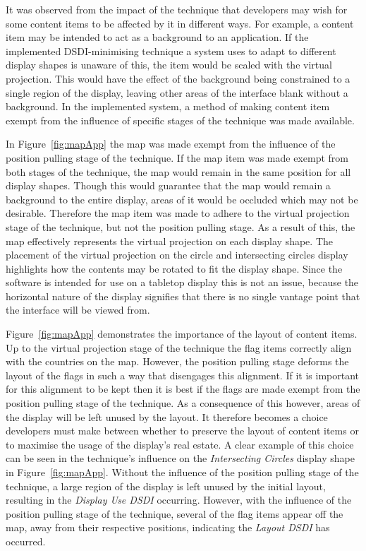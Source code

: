 \documentclass{bmcart}
\begin{document}
It was observed from the impact of the technique that developers may wish for some content items to be affected by it in different ways.
For example, a content item may be intended to act as a background to an application.
If the implemented \ac{DSDI}-minimising technique a system uses to adapt to different display shapes is unaware of this, the item would be scaled with the virtual projection.
This would have the effect of the background being constrained to a single region of the display, leaving other areas of the interface blank without a background.
In the implemented system, a method of making content item exempt from the influence of specific stages of the technique was made available.


In Figure~\ref{fig:mapApp} the map was made exempt from the influence of the position pulling stage of the technique.
If the map item was made exempt from both stages of the technique, the map would remain in the same position for all display shapes.
Though this would guarantee that the map would remain a background to the entire display, areas of it would be occluded which may not be desirable.
Therefore the map item was made to adhere to the virtual projection stage of the technique, but not the position pulling stage.
As a result of this, the map effectively represents the virtual projection on each display shape.
The placement of the virtual projection on the circle and intersecting circles display highlights how the contents may be rotated to fit the display shape.
Since the software is intended for use on a tabletop display this is not an issue, because the horizontal nature of the display signifies that there is no single vantage point that the interface will be viewed from.


Figure~\ref{fig:mapApp} demonstrates the importance of the layout of content items.
Up to the virtual projection stage of the technique the flag items correctly align with the countries on the map.
However, the position pulling stage deforms the layout of the flags in such a way that disengages this alignment.
If it is important for this alignment to be kept then it is best if the flags are made exempt from the position pulling stage of the technique.
As a consequence of this however, areas of the display will be left unused by the layout.
It therefore becomes a choice developers must make between whether to preserve the layout of content items or to maximise the usage of the display's real estate.
A clear example of this choice can be seen in the technique's influence on the {\emph{Intersecting Circles}} display shape in Figure~\ref{fig:mapApp}.
Without the influence of the position pulling stage of the technique, a large region of the display is left unused by the initial layout, resulting in the {\emph{Display Use \ac{DSDI}}} occurring.
However, with the influence of the position pulling stage of the technique, several of the flag items appear off the map, away from their respective positions, indicating the {\emph{Layout \ac{DSDI}}} has occurred.
\end{document}
